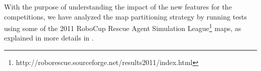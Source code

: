With the purpose of understanding the impact of the new features for the competitions, we have analyzed the map partitioning strategy by running tests using some of the 2011 RoboCup Rescue Agent Simulation League\footnote{http://roborescue.sourceforge.net/results2011/index.html} maps, as explained in more details in \cite{artigo-particionamento}.